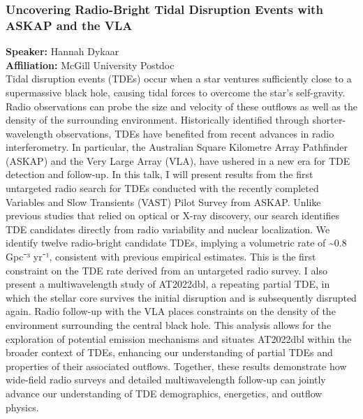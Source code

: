 \subsubsection*{Uncovering Radio-Bright Tidal Disruption Events with ASKAP and the VLA}
\textbf{Speaker:} Hannah Dykaar \\
\textbf{Affiliation:} McGill University \textperiodcentered{} Postdoc\\
Tidal disruption events (TDEs) occur when a star ventures sufficiently close to a supermassive black hole, causing tidal forces to overcome the star's self-gravity. Radio observations can probe the size and velocity of these outflows as well as the density of the surrounding environment. Historically identified through shorter-wavelength observations, TDEs have benefited from recent advances in radio interferometry. In particular, the Australian Square Kilometre Array Pathfinder (ASKAP) and the Very Large Array (VLA), have ushered in a new era for TDE detection and follow-up. In this talk, I will present results from the first untargeted radio search for TDEs conducted with the recently completed Variables and Slow Transients (VAST) Pilot Survey from ASKAP. Unlike previous studies that relied on optical or X-ray discovery, our search identifies TDE candidates directly from radio variability and nuclear localization. We identify twelve radio-bright candidate TDEs, implying a volumetric rate of \textasciitilde{}0.8 Gpc⁻³ yr⁻¹, consistent with previous empirical estimates. This is the first constraint on the TDE rate derived from an untargeted radio survey. I also present a multiwavelength study of AT2022dbl, a repeating partial TDE, in which the stellar core survives the initial disruption and is subsequently disrupted again. Radio follow-up with the VLA places constraints on the density of the environment surrounding the central black hole. This analysis allows for the exploration of potential emission mechanisms and situates AT2022dbl within the broader context of TDEs, enhancing our understanding of partial TDEs and properties of their associated outflows. Together, these results demonstrate how wide-field radio surveys and detailed multiwavelength follow-up can jointly advance our understanding of TDE demographics, energetics, and outflow physics.

\hypertarget{abs-37}{}
